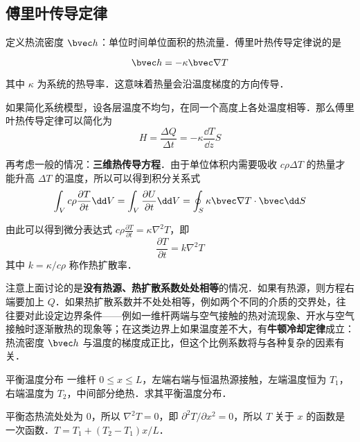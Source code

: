 
\subsection{傅里叶传导定律}
定义热流密度 $\bvec h$：单位时间单位面积的热流量．傅里叶热传导定律说的是

\begin{equation}
\bvec h = -\kappa \bvec \nabla T
\end{equation}

其中 $\kappa$ 为系统的热导率．这意味着热量会沿温度梯度的方向传导．

如果简化系统模型，设各层温度不均匀，在同一个高度上各处温度相等．那么傅里叶热传导定律可以简化为
\begin{equation}
H=\frac{\Delta Q}{\Delta t}=-\kappa \frac{\dd T}{\dd z}S
\end{equation}

再考虑一般的情况：\textbf{三维热传导方程}．由于单位体积内需要吸收 $c\rho \Delta T$ 的热量才能升高 $\Delta T$ 的温度，所以可以得到积分关系式
\begin{equation}
\int_V c\rho \frac{\partial T}{\partial t} \dd V = \int_V \frac{\partial U}{\partial t} \dd V= \oint_S \kappa \bvec \nabla T \cdot \bvec \dd S
\end{equation}

由此可以得到微分表达式 $c\rho \frac{\partial T}{\partial t} = \kappa \nabla^2 T$，即
\begin{equation}
\frac{\partial T}{\partial t}=k\nabla^2 T
\end{equation}
其中 $k=\kappa/c\rho$ 称作热扩散率．

注意上面讨论的是\textbf{没有热源、热扩散系数处处相等}的情况．如果有热源，则方程右端要加上 $Q$．如果热扩散系数并不处处相等，例如两个不同的介质的交界处，往往要对此设定边界条件——例如一维杆两端与空气接触的热对流现象、开水与空气接触时逐渐散热的现象等；在这类边界上如果温度差不大，有\textbf{牛顿冷却定律}成立：热流密度 $\bvec h$ 与温度的梯度成正比，但这个比例系数将与各种复杂的因素有关．

\begin{example}{平衡温度分布}
一维杆 $0\le x\le L$，左端右端与恒温热源接触，左端温度恒为 $T_1$，右端温度为 $T_2$，中间部分绝热．求其平衡温度分布．

平衡态热流处处为 $0$，所以 $\nabla^2 T=0$，即 $\partial^2 T/\partial x^2=0$，所以 $T$ 关于 $x$ 的函数是一次函数．$T=T_1+(T_2-T_1)x/L$．
\end{example}

